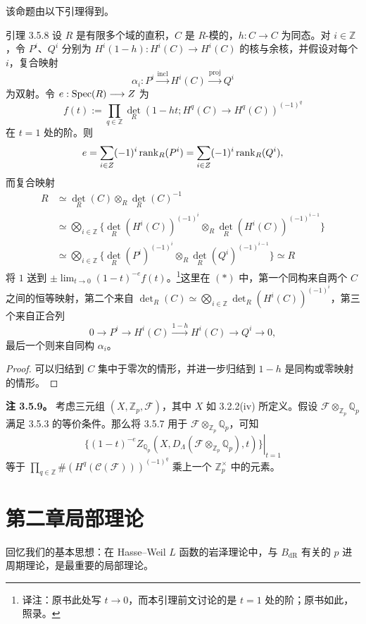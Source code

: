 该命题由以下引理得到。
\begin{statement}{引理 3.5.8}
设 $R$ 是有限多个域的直积，$C$ 是 $R$-模的，$h:C\longrightarrow C$ 为同态。对 $i\in\mathbb Z$，令 $P^i$、$Q^i$ 分别为
$H^i(1-h):H^i(C)\longrightarrow H^i(C)$ 的核与余核，并假设对每个 $i$，复合映射
\[
 \alpha_i:P^i\xrightarrow{\mathrm{incl}}H^i(C)\xrightarrow{\mathrm{proj}}Q^i
\]
为双射。令 $e:\operatorname{Spec}(R)\longrightarrow Z$ 为
\[
 f(t):=\prod_{q\in\mathbb Z}\det_R(1-ht;H^q(C)\longrightarrow H^q(C))^{(-1)^q}
\]
在 $t=1$ 处的阶。则
\[
 e=\sum_{i\in Z}(-1)^i\operatorname{rank}_R(P^i)=\sum_{i\in Z}(-1)^i\operatorname{rank}_R(Q^i),
\]
而复合映射
\begin{align*}
 R&\simeq\det_R(C)\otimes_R\det_R(C)^{-1}\\
 &\simeq\bigotimes_{i\in\mathbb Z}\bigl\{\det_R(H^i(C))^{(-1)^i}\otimes_R\det_R(H^i(C))^{(-1)^{i-1}}\bigr\}\\
 &\simeq\bigotimes_{i\in\mathbb Z}\bigl\{\det_R(P^i)^{(-1)^i}\otimes_R\det_R(Q^i)^{(-1)^{i-1}}\bigr\}\simeq R\tag{*}
\end{align*}
将 $1$ 送到 $\pm\lim_{t\to0}(1-t)^{-e}f(t)$。\footnote{译注：原书此处写 $t\to0$，而本引理前文讨论的是 $t=1$ 处的阶；原书如此，照录。}这里在 $(*)$ 中，第一个同构来自两个 $C$ 之间的恒等映射，第二个来自
$\det_R(C)\simeq\bigotimes_{i\in\mathbb Z}\det_R(H^i(C))^{(-1)^i}$，第三个来自正合列
\[
 0\longrightarrow P^i\longrightarrow H^i(C)\xrightarrow{1-h}H^i(C)\longrightarrow Q^i\longrightarrow0,
\]
最后一个则来自同构 $\alpha_i$。
\end{statement}
\begin{proof}
可以归结到 $C$ 集中于零次的情形，并进一步归结到 $1-h$ 是同构或零映射的情形。
\end{proof}
\textbf{注 3.5.9。} 考虑三元组 $(X,\mathbb Z_p,\mathcal F)$，其中 $X$ 如 3.2.2(iv) 所定义。假设 $\mathcal F\otimes_{\mathbb Z_p}\mathbb Q_p$ 满足 3.5.3 的等价条件。那么将 3.5.7 用于 $\mathcal F\otimes_{\mathbb Z_p}\mathbb Q_p$，可知
\[
 \left.\{(1-t)^{-e}Z_{\mathbb Q_p}(X,D_\Lambda(\mathcal F\otimes_{\mathbb Z_p}\mathbb Q_p),t)\}\right|_{t=1}
\]
等于
$\prod_{q\in\mathbb Z}\#(H^q(\mathcal C(\mathcal F)))^{(-1)^q}$ 乘上一个 $\mathbb Z_p^\times$ 中的元素。

\section*{第二章\quad 局部理论}
回忆我们的基本思想：在 Hasse--Weil $L$ 函数的岩泽理论中，与 $B_{\mathrm{dR}}$ 有关的 $p$ 进周期理论，是最重要的局部理论。

